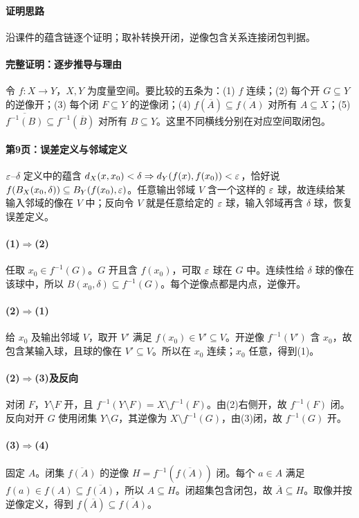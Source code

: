 \paragraph{证明思路}沿课件的蕴含链逐个证明；取补转换开闭，逆像包含关系连接闭包判据。
\paragraph{完整证明：逐步推导与理由}

令 $f:X\to Y$，$X,Y$ 为度量空间。要比较的五条为：(1) $f$ 连续；(2) 每个开 $G\subseteq Y$ 的逆像开；(3) 每个闭 $F\subseteq Y$ 的逆像闭；(4) $f(\overline A)\subseteq\overline{f(A)}$ 对所有 $A\subseteq X$；(5) $\overline{f^{-1}(B)}\subseteq f^{-1}(\overline B)$ 对所有 $B\subseteq Y$。这里不同横线分别在对应空间取闭包。
\paragraph{第9页：误差定义与邻域定义}
$\varepsilon$--$\delta$ 定义中的蕴含 $d_X(x,x_0)<\delta\Rightarrow d_Y(f(x),f(x_0))<\varepsilon$，恰好说 $f(B_X(x_0,\delta))\subseteq B_Y(f(x_0),\varepsilon)$。任意输出邻域 $V$ 含一个这样的 $\varepsilon$ 球，故连续给某输入邻域的像在 $V$ 中；反向令 $V$ 就是任意给定的 $\varepsilon$ 球，输入邻域再含 $\delta$ 球，恢复误差定义。
\paragraph{(1)$\Rightarrow$(2)}任取 $x_0\in f^{-1}(G)$。$G$ 开且含 $f(x_0)$，可取 $\varepsilon$ 球在 $G$ 中。连续性给 $\delta$ 球的像在该球中，所以 $B(x_0,\delta)\subseteq f^{-1}(G)$。每个逆像点都是内点，逆像开。
\paragraph{(2)$\Rightarrow$(1)}给 $x_0$ 及输出邻域 $V$，取开 $V'$ 满足 $f(x_0)\in V'\subseteq V$。开逆像 $f^{-1}(V')$ 含 $x_0$，故包含某输入球，且球的像在 $V'\subseteq V$。所以在 $x_0$ 连续；$x_0$ 任意，得到(1)。
\paragraph{(2)$\Rightarrow$(3)及反向}对闭 $F$，$Y\setminus F$ 开，且 $f^{-1}(Y\setminus F)=X\setminus f^{-1}(F)$。由(2)右侧开，故 $f^{-1}(F)$ 闭。反向对开 $G$ 使用闭集 $Y\setminus G$，其逆像为 $X\setminus f^{-1}(G)$，由(3)闭，故 $f^{-1}(G)$ 开。
\paragraph{(3)$\Rightarrow$(4)}固定 $A$。闭集 $\overline{f(A)}$ 的逆像 $H=f^{-1}(\overline{f(A)})$ 闭。每个 $a\in A$ 满足 $f(a)\in f(A)\subseteq\overline{f(A)}$，所以 $A\subseteq H$。闭超集包含闭包，故 $\overline A\subseteq H$。取像并按逆像定义，得到 $f(\overline A)\subseteq\overline{f(A)}$。
